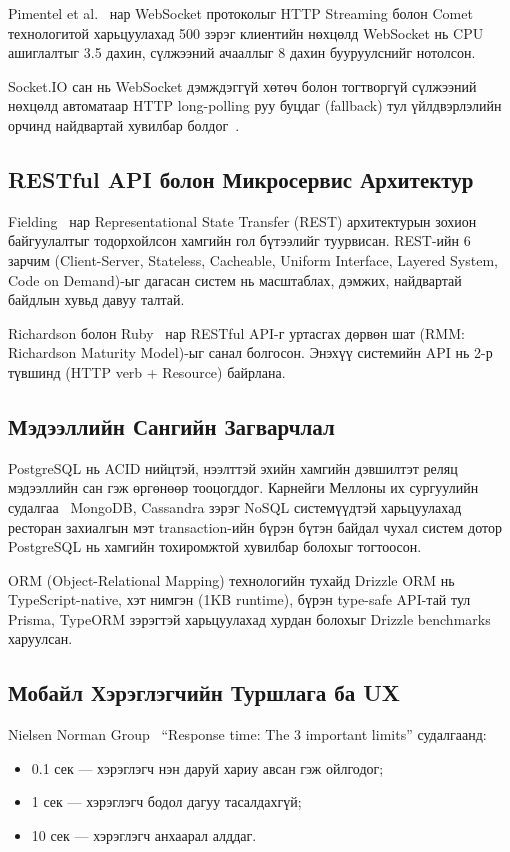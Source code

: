 \documentclass[12pt,a4paper]{article}
\begin{document}
Pimentel et al.~\cite{pimentel2012} нар WebSocket протоколыг HTTP
Streaming болон Comet технологитой харьцуулахад 500 зэрэг клиентийн
нөхцөлд WebSocket нь CPU ашиглалтыг 3.5 дахин, сүлжээний
ачааллыг 8 дахин бууруулснийг нотолсон.

Socket.IO сан нь WebSocket дэмждэггүй хөтөч болон тогтворгүй
сүлжээний нөхцөлд автоматаар HTTP long-polling руу буцдаг
(fallback) тул үйлдвэрлэлийн орчинд найдвартай хувилбар болдог~\cite{socketio2022}.

\subsection{RESTful API болон Микросервис Архитектур}

Fielding~\cite{fielding2000} нар Representational State Transfer
(REST) архитектурын зохион байгуулалтыг тодорхойлсон хамгийн гол
бүтээлийг туурвисан. REST-ийн 6 зарчим (Client-Server, Stateless,
Cacheable, Uniform Interface, Layered System, Code on Demand)-ыг
дагасан систем нь масштаблах, дэмжих, найдвартай байдлын хувьд
давуу талтай.

Richardson болон Ruby~\cite{richardson2013} нар RESTful API-г
уртасгах дөрвөн шат (RMM: Richardson Maturity Model)-ыг санал
болгосон. Энэхүү системийн API нь 2-р түвшинд (HTTP verb + Resource)
байрлана.

\subsection{Мэдээллийн Сангийн Загварчлал}

PostgreSQL нь ACID нийцтэй, нээлттэй эхийн хамгийн дэвшилтэт
реляц мэдээллийн сан гэж өргөнөөр тооцогддог. Карнейги Меллоны
их сургуулийн судалгаа~\cite{stonebraker2010} MongoDB, Cassandra
зэрэг NoSQL системүүдтэй харьцуулахад ресторан захиалгын мэт
transaction-ийн бүрэн бүтэн байдал чухал систем дотор
PostgreSQL нь хамгийн тохиромжтой хувилбар болохыг тогтоосон.

ORM (Object-Relational Mapping) технологийн тухайд Drizzle ORM
нь TypeScript-native, хэт нимгэн (1KB runtime), бүрэн type-safe
API-тай тул Prisma, TypeORM зэрэгтэй харьцуулахад хурдан болохыг
Drizzle benchmarks~\cite{drizzle2023} харуулсан.

\subsection{Мобайл Хэрэглэгчийн Туршлага ба UX}

Nielsen Norman Group~\cite{nngroup2021} ``Response time: The 3
important limits'' судалгаанд:
\begin{itemize}
  \item 0.1 сек --- хэрэглэгч нэн даруй хариу авсан гэж ойлгодог;
  \item 1 сек --- хэрэглэгч бодол дагуу тасалдахгүй;
  \item 10 сек --- хэрэглэгч анхаарал алддаг.
\end{itemize}
\end{document}

